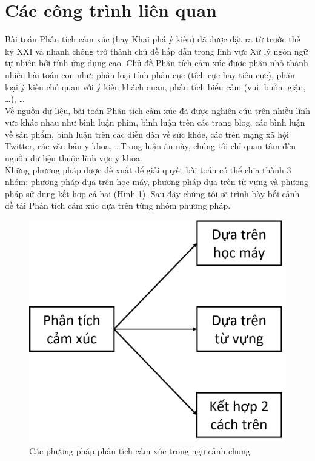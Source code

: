 \section{Các công trình liên quan}
Bài toán Phân tích cảm xúc (hay Khai phá ý kiến) đã được đặt ra từ trước thế kỷ XXI và nhanh chóng trở thành chủ đề hấp dẫn trong lĩnh vực Xử lý ngôn ngữ tự nhiên bởi tính ứng dụng cao. Chủ đề Phân tích cảm xúc được phân nhỏ thành nhiều bài toán con như: phân loại tính phân cực (tích cực hay tiêu cực), phân loại ý kiến chủ quan với ý kiến khách quan, phân tích biểu cảm (vui, buồn, giận, \ldots), \ldots\\

Về nguồn dữ liệu, bài toán Phân tích cảm xúc đã được nghiên cứu trên nhiều lĩnh vực khác nhau như bình luận phim, bình luận trên các trang blog, các bình luận về sản phẩm, bình luận trên các diễn đàn về sức khỏe, các  trên mạng xã hội Twitter, các văn bản y khoa, \ldots Trong luận án này, chúng tôi chỉ quan tâm đến nguồn dữ liệu thuộc lĩnh vực y khoa.\\

Những phương pháp được đề xuất để giải quyết bài toán có thể chia thành 3 nhóm\cite{Silva2015}: phương pháp dựa trên học máy, phương pháp dựa trên từ vựng và phương pháp sử dụng kết hợp cả hai (Hình \ref{fig:cac-pp-phan-tich}). Sau đây chúng tôi sẽ trình bày bối cảnh đề tài Phân tích cảm xúc dựa trên từng nhóm phương pháp.
\begin{figure}
\centering
\includegraphics[scale=0.25]{../hinh/cac_pp_phan_tich.png}
\caption{Các phương pháp phân tích cảm xúc trong ngữ cảnh chung}
\label{fig:cac-pp-phan-tich}
\end{figure}
